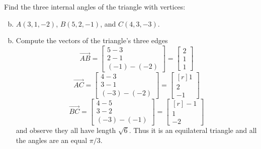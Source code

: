 \documentclass[../main.tex]{subfiles}
\begin{document}
Find the three internal angles of the triangle with vertices:
\begin{enumerate}[a)]
	\setcounter{enumi}{1}
	\item $A(3, 1, -2)$, $B(5, 2, -1)$, and $C(4, 3, -3)$.
\end{enumerate}

\solution
\begin{enumerate}[a)]
	\setcounter{enumi}{1}
	\item Compute the vectors of the triangle's three edges
		\[
			\overrightarrow{AB}
			=
			\begin{bmatrix}
				5 - 3 \\
				2 - 1 \\
				(-1) - (-2)
			\end{bmatrix}
			=
			\begin{bmatrix}
				2 \\
				1 \\
				1
			\end{bmatrix}
		\]
		\[
			\overrightarrow{AC}
			=
			\begin{bmatrix}
				4 - 3 \\
				3 - 1 \\
				(-3) - (-2)
			\end{bmatrix}
			=
			\begin{bmatrix*}[r]
				1 \\
				2 \\
				-1
			\end{bmatrix*}
		\]
		\[
			\overrightarrow{BC}
			=
			\begin{bmatrix}
				4 - 5 \\
				3 - 2 \\
				(-3) - (-1)
			\end{bmatrix}
			=
			\begin{bmatrix*}[r]
				-1 \\
				1 \\
				-2
			\end{bmatrix*}
		\]
		and observe they all have length $\sqrt{6}$.
		Thus it is an equilateral triangle and all the angles are an equal $\pi/3$.
\end{enumerate}
\end{document}
